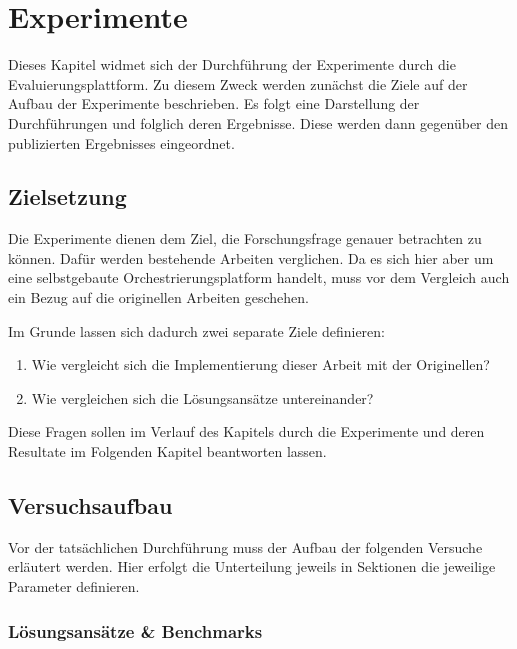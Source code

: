 \chapter{Experimente}\label{ch:Experimente}


Dieses Kapitel widmet sich der Durchführung der Experimente durch die Evaluierungsplattform. Zu diesem Zweck werden zunächst die Ziele auf der Aufbau der Experimente beschrieben. Es folgt eine Darstellung der Durchführungen und folglich deren Ergebnisse. Diese werden dann gegenüber den publizierten Ergebnisses eingeordnet.

\section{Zielsetzung}\label{ch:Zielsetzung}

Die Experimente dienen dem Ziel, die Forschungsfrage  genauer betrachten zu können. Dafür werden bestehende Arbeiten verglichen. Da es sich hier aber um eine selbstgebaute Orchestrierungsplatform handelt, muss vor dem Vergleich auch ein Bezug auf die originellen Arbeiten geschehen.

Im Grunde lassen sich dadurch zwei separate Ziele definieren:

\begin{enumerate}
    \item Wie vergleicht sich die Implementierung dieser Arbeit mit der Originellen?
    \item Wie vergleichen sich die Lösungsansätze untereinander?
\end{enumerate}

Diese Fragen sollen im Verlauf des Kapitels durch die Experimente und deren Resultate im Folgenden Kapitel beantworten lassen.

\section{Versuchsaufbau}\label{ch:Versuchsaufbau}

Vor der tatsächlichen Durchführung muss der Aufbau der folgenden Versuche erläutert werden. Hier erfolgt die Unterteilung jeweils in Sektionen die jeweilige Parameter definieren.

\subsection{Lösungsansätze \& Benchmarks}\label{ch:Versuchsaufbau:Lösungsansätze_Benchmarks}

